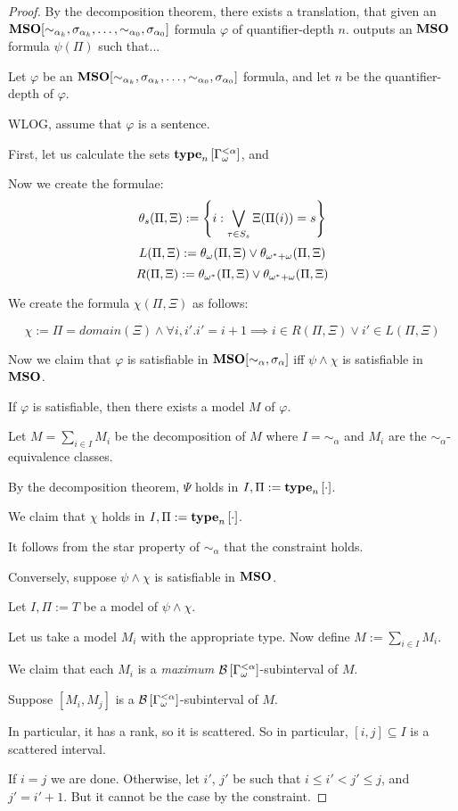 \begin{proof}
  By the decomposition theorem, there exists a translation,
  that given an $\mathbf{MSO}[\sim_{\alpha_k}, \sigma_{\alpha_k}, \ldots, \sim_{\alpha_0}, \sigma_{\alpha_0}]$ formula $\varphi$ of quantifier-depth $n$.
  outputs an $\mathbf{MSO}$ formula $\psi(\Pi)$ such that...

  Let $\varphi$ be an
  $\mathbf{MSO}[\sim_{\alpha_k}, \sigma_{\alpha_k}, \ldots, \sim_{\alpha_0}, \sigma_{\alpha_0}]$
  formula,
  and let $n$ be the quantifier-depth of $\varphi$.

  WLOG, assume that $\varphi$ is a sentence.

  First, let us calculate the sets
  $\mathbf{type}_{n} \left[ {\Gamma_{\omega}^{< \alpha}} \right]$,
  and 

  Now we create the formulae:
  \[\theta_s(\Pi, \Xi) := \left\{ {i : \bigvee_{\tau \in S_s}{\Xi(\Pi(i)) = s}} \right\}\]
  \[L(\Pi, \Xi) := \theta_{\omega}(\Pi, \Xi) \vee \theta_{\omega^\ast + \omega}(\Pi, \Xi)\]
  \[R(\Pi, \Xi) := \theta_{\omega^\ast}(\Pi, \Xi) \vee \theta_{\omega^\ast + \omega}(\Pi, \Xi)\]

  We create the formula $\chi(\Pi, \Xi)$ as follows:

  \[\chi := \Pi = domain(\Xi) \wedge \forall i, i'. i' = i + 1 \implies {i \in R(\Pi, \Xi) \vee i' \in L(\Pi, \Xi)}\]

  Now we claim that $\varphi$ is satisfiable in $\mathbf{MSO}[\sim_{\alpha}, \sigma_{\alpha}]$
  iff $\psi \land \chi$ is satisfiable in $\mathbf{MSO}$.

  If $\varphi$ is satisfiable, then there exists a model $M$ of $\varphi$.

  Let $M = \sum_{i \in I} M_i$ be the decomposition of $M$
  where $I = \sim_{\alpha}$ and $M_i$ are the $\sim_{\alpha}$-equivalence classes.

  By the decomposition theorem, $\Psi$ holds
  in $I, \Pi := \mathbf{type}_{n} \left[ {\cdot} \right]$.

  We claim that $\chi$ holds in $I, \Pi := \mathbf{type}_{n} \left[ {\cdot} \right]$.

  It follows from the star property of $\sim_{\alpha}$ that the constraint holds.

  Conversely, suppose $\psi \land \chi$ is satisfiable in $\mathbf{MSO}$.

  Let $I, \Pi := T$ be a model of $\psi \land \chi$.

  Let us take a model $M_i$ with the appropriate type.
  Now define $M := \sum_{i \in I} M_i$.

  We claim that each $M_i$ is a \emph{maximum} $\mathcal{B} \left[ {{\Gamma_{\omega}^{< \alpha}}} \right]$-subinterval
  of $M$.

  Suppose $[M_i, M_j]$ is a $\mathcal{B} \left[ {{\Gamma_{\omega}^{< \alpha}}} \right]$-subinterval of $M$.

  In particular, it has a rank, so it is scattered. So in particular,
  $[i, j] \subseteq I$ is a scattered interval.

  If $i = j$ we are done. Otherwise, let $i'$, $j'$ be such that $i \le i' < j' \le j$,
  and $j' = i' + 1$.  But it cannot be the case by the constraint.

\end{proof}
